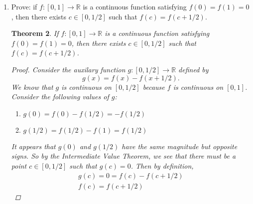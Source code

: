 \documentclass{amsart}
\newtheorem{theorem}{Theorem}
\begin{document}
\begin{enumerate}[1.]
    \begin{theorem}
        For $f: \mathbb{R^+} \to \mathbb{R}$ defined by $\displaystyle f(x) = \frac{1}{x}$ and $\displaystyle x_n = \frac{1}{n}$, $(f(x_n))$ is not Cauchy.
        \begin{proof}
            Since $\displaystyle x_n = \frac{1}{n}$ converges to $0$ in $\mathbb{R}$, we know that $(x_n)$ is Cauchy.
            Consider
            \begin{align*}
                |f(x_n) - f(x_m)| &= \left| \frac{1}{\frac{1}{n}} - \frac{1}{\frac{1}{m}} \right| \\
                &= |n - m|
            \end{align*}
            As $m,n$ are allowed to become large, $|n - m|$ is not bounded. Consider $\epsilon = 1$ and $N = 1$. If $m,n \geq N$, 
            it is not guaranteed that $|n - m| < \epsilon$. Thus, there exists an $\epsilon > 0$ such that for all $N \in \mathbb{N}$, if
            $m,n > N$, then $|n - m|$ is not necessarily less than $\epsilon$. Thus, $(f(x_n))$ is not Cauchy.
        \end{proof}
    \end{theorem}
  
    \newpage
    \item Prove: if $f: [0,1] \to \mathbb{R}$ is a continuous function satisfying $f(0)=f(1)=0$, then there exists $c \in [0,1/2]$ such that $f(c) = f(c+1/2)$.
    \begin{theorem}
        If $f: [0,1] \to \mathbb{R}$ is a continuous function satisfying $f(0)=f(1)=0$, then there exists $c \in [0,1/2]$ such that $f(c) = f(c+1/2)$.
        \begin{proof}
            Consider the auxilary function $g: [0, 1/2] \to \mathbb{R}$ defined by
            \[
                g(x) = f(x) - f(x + 1/2).    
            \]
            We know that $g$ is continuous on $[0,1/2]$ because $f$ is continuous on $[0,1]$.
            Consider the following values of $g$:
            \begin{enumerate}
                \item $g(0) = f(0) - f(1/2) = -f(1/2)$
                \item $g(1/2) = f(1/2) - f(1) = f(1/2)$
            \end{enumerate}
            It appears that $g(0)$ and $g(1/2)$ have the same magnitude but opposite signs. So by the Intermediate Value Theorem,
            we see that there must be a point $c \in [0, 1/2]$ such that $g(c) = 0$. Then by definition,
            \begin{align*}
                g(c) = 0 = f(c) - f(c + 1/2) \\
                f(c) = f(c + 1/2)
            \end{align*}
        \end{proof}
    \end{theorem}
    

\end{enumerate}
\end{document}
